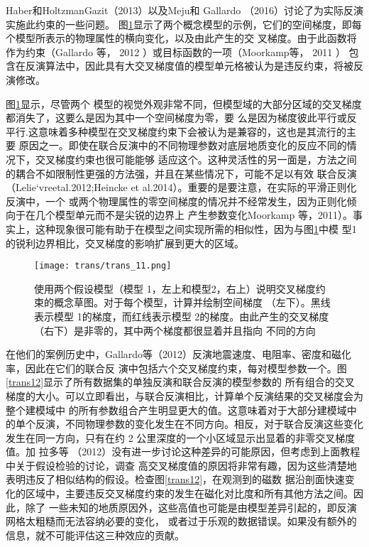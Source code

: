 Haber和HoltzmanGazit（2013）以及Meju和 Gallardo （2016）讨论了为实际反演实施此约束的一些问题。 图\ref{trans11}显示了两个概念模型的示例，它们的空间梯度，即每个模型所表示的物理属性的横向变化，以及由此产生的交 叉梯度。由于此函数将作为约束（Gallardo 等， 2012 ）或目标函数的一项（Moorkamp等， 2011 ） 包含在反演算法中，因此具有大交叉梯度值的模型单元格被认为是违反约束，将被反演修改。

图\ref{trans11}显示，尽管两个 模型的视觉外观非常不同，但模型域的大部分区域的交叉梯度都消失了，这要么是因为其中一个空间梯度为零，要 么是因为梯度彼此平行或反平行.这意味着多种模型在交叉梯度约束下会被认为是兼容的，这也是其流行的主要 原因之一。即使在联合反演中的不同物理参数对底层地质变化的反应不同的情况下，交叉梯度约束也很可能能够 适应这个。这种灵活性的另一面是，方法之间的耦合不如限制性更强的方法强，并且在某些情况下，可能不足以有效 联合反演 （Lelie`vreetal.2012;Heincke et al.2014）。重要的是要注意，在实际的平滑正则化反演中，一个 或两个物理属性的零空间梯度的情况并不经常发生，因为正则化倾向于在几个模型单元而不是尖锐的边界上 产生参数变化Moorkamp 等，2011）。事实上，这种现象很可能有助于在模型之间实现所需的相似性，因为与图\ref{trans11}中模 型1 的锐利边界相比，交叉梯度的影响扩展到更大的区域。

\begin{figure}
    \centering
    \texttt{[image: trans/trans\_11.png]}
    \setcounter{figure}{3}
    \caption{使用两个假设模型（模型 1，左上和模型2，右上）说明交叉梯度约束的概念草图。对于每个模型，计算并绘制空间梯度 （左下）。黑线表示模型 1的梯度，而红线表示模型 2的梯度。由此产生的交叉梯度（右下）是非零的，其中两个梯度都很显着并且指向 不同的方向}\label{trans11}

\end{figure}

在他们的案例历史中，Gallardo等（2012）反演地震速度、电阻率、密度和磁化率，因此在它们的联合反 演中包括六个交叉梯度约束，每对模型参数一个。图\ref{trans12}显示了所有数据集的单独反演和联合反演的模型参数的 所有组合的交叉梯度的大小。可以立即看出，与联合反演相比，计算单个反演结果的交叉梯度会为整个建模域中 的所有参数组合产生明显更大的值。这意味着对于大部分建模域中的单个反演，不同物理参数的变化发生在不同方向。相反，对于联合反演这些变化发生在同一方向，只有在约 2 公里深度的一个小区域显示出显着的非零交叉梯度值。加 拉多等 （2012）没有进一步讨论这种差异的可能原因，但考虑到上面教程中关于假设检验的讨论，调查 高交叉梯度值的原因将非常有趣，因为这些清楚地表明违反了相似结构的假设。检查图\ref{trans12}，在观测到的磁数 据沿剖面快速变化的区域中，主要违反交叉梯度约束的发生在磁化对比度和所有其他方法之间。因此，除了 一些未知的地质原因外，这些高值也可能是由模型差异引起的，即反演网格太粗糙而无法容纳必要的变化， 或者过于乐观的数据错误。如果没有额外的信息，就不可能评估这三种效应的贡献。

